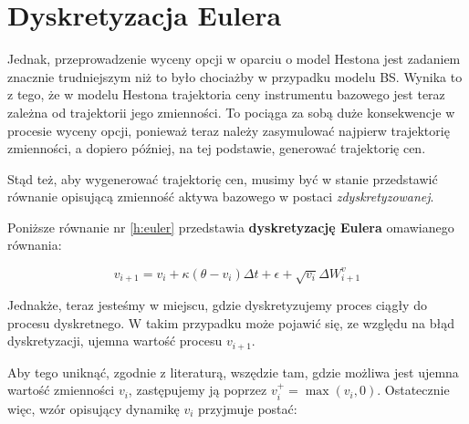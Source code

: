 \documentclass{pracamgr}
\begin{document}







\section{Dyskretyzacja Eulera}

Jednak, przeprowadzenie wyceny opcji w oparciu o model Hestona jest zadaniem znacznie trudniejszym
niż to było chociażby w przypadku modelu BS. Wynika to z tego, że w modelu Hestona trajektoria 
ceny instrumentu bazowego jest teraz zależna od trajektorii jego zmienności. To pociąga za sobą 
duże konsekwencje w procesie wyceny opcji, ponieważ teraz należy zasymulować najpierw trajektorię zmienności, a dopiero później, na tej podstawie, generować trajektorię cen. 

Stąd też, aby wygenerować trajektorię cen, musimy być w stanie przedstawić równanie opisującą
zmienność aktywa bazowego w postaci \textit{zdyskretyzowanej}.

Poniższe równanie nr \ref{h:euler} przedstawia \textbf{dyskretyzację Eulera} omawianego równania:
 
\begin{equation}\label{h:euler}
v_{i+1}  = v_i + \kappa (\theta - v_i) \Delta t + \epsilon +  \sqrt{v_i} \Delta W^{v}_{i+1}
\end{equation}

Jednakże, teraz jesteśmy w miejscu, gdzie dyskretyzujemy proces ciągły do procesu dyskretnego. 
W takim przypadku może pojawić się, ze względu na błąd dyskretyzacji, ujemna wartość procesu $v_{i+1}$.

Aby tego uniknąć, zgodnie z literaturą, wszędzie tam, gdzie możliwa jest ujemna 
wartość zmienności $v_i$, zastępujemy ją poprzez $v_i^+ = \max(v_i, 0)$. Ostatecznie więc, wzór
opisujący dynamikę $v_i$ przyjmuje postać:
\end{document}
